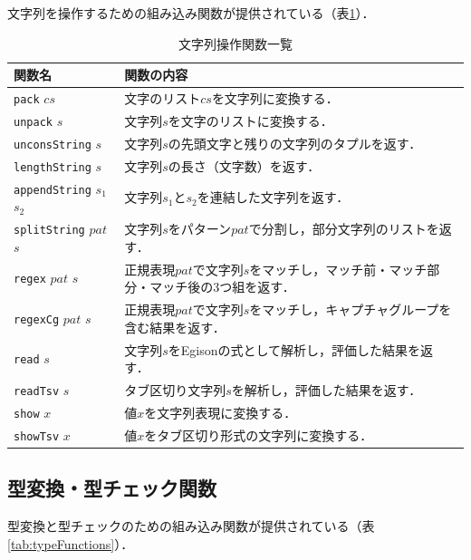 文字列を操作するための組み込み関数が提供されている（表\ref{tab:stringFunctions}）．

\begin{table}[h]
  \begin{center}
    \begin{tabular}{ | l | p{9cm} |}
    \hline
    関数名 & 関数の内容 \\ \hline
    \texttt{pack} $cs$ & 文字のリスト$cs$を文字列に変換する． \\ \hline
    \texttt{unpack} $s$ & 文字列$s$を文字のリストに変換する． \\ \hline
    \texttt{unconsString} $s$ & 文字列$s$の先頭文字と残りの文字列のタプルを返す． \\ \hline
    \texttt{lengthString} $s$ & 文字列$s$の長さ（文字数）を返す． \\ \hline
    \texttt{appendString} $s_1$ $s_2$ & 文字列$s_1$と$s_2$を連結した文字列を返す． \\ \hline
    \texttt{splitString} $pat$ $s$ & 文字列$s$をパターン$pat$で分割し，部分文字列のリストを返す． \\ \hline
    \texttt{regex} $pat$ $s$ & 正規表現$pat$で文字列$s$をマッチし，マッチ前・マッチ部分・マッチ後の3つ組を返す． \\ \hline
    \texttt{regexCg} $pat$ $s$ & 正規表現$pat$で文字列$s$をマッチし，キャプチャグループを含む結果を返す． \\ \hline
    \texttt{read} $s$ & 文字列$s$をEgisonの式として解析し，評価した結果を返す． \\ \hline
    \texttt{readTsv} $s$ & タブ区切り文字列$s$を解析し，評価した結果を返す． \\ \hline
    \texttt{show} $x$ & 値$x$を文字列表現に変換する． \\ \hline
    \texttt{showTsv} $x$ & 値$x$をタブ区切り形式の文字列に変換する． \\ \hline
    \end{tabular}
\end{center}
    \caption{文字列操作関数一覧}
    \label{tab:stringFunctions}
\end{table}

\subsection{型変換・型チェック関数}

型変換と型チェックのための組み込み関数が提供されている（表\ref{tab:typeFunctions}）．

